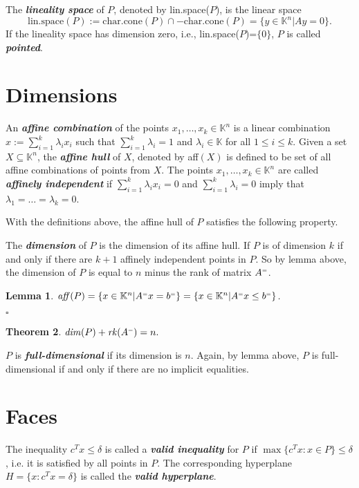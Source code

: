 \documentclass{article}
\newcounter{lecnum}
\newcommand{\teq}{^{\mbox{\tiny $=$}}}
\newtheorem{theorem}{Theorem}[lecnum]
\newtheorem{lemma}[theorem]{Lemma}
\newenvironment{proof}{{\it Proof.}}{ \hfill $\square$}
\def\K{{\mathbb K}}
\begin{document}
The \emph{\textbf{lineality space}} of $P$, denoted by lin.space($P$), is the linear space
$$\mbox{lin.space}(P):=\mbox{char.cone}(P)\cap -\mbox{char.cone}(P)=\{y\in\K^n|Ay=0\}.$$
If the lineality space has dimension zero, i.e., lin.space($P$)=$\{0\}$, $P$ is called \emph{\textbf{pointed}}.

\section{Dimensions}
An \emph{\textbf{affine combination}} of the points $x_1,\dots,x_k\in\K^n$ is a linear combination $x:=\sum_{i=1}^{k}\lambda_i x_i$ such that $\sum_{i=1}^{k}\lambda_i=1$ and $\lambda_i\in\K$ for all $1\leq i\leq k$. Given a set $X\subseteq \K^n$, the \emph{\textbf{affine hull}} of $X$, denoted by aff$(X)$ is defined to be set of all affine combinations of points from $X$. The points $x_1,\dots,x_k\in \K^n$ are called \emph{\textbf{affinely independent}} if $\sum_{i=1}^{k}\lambda_i x_i=0$ and $\sum_{i=1}^{k}\lambda_i=0$ imply that $\lambda_1=\dots=\lambda_k=0$.



With the definitions above, the affine hull of $P$ satisfies the following property.

The \emph{\textbf{dimension}} of $P$ is the dimension of its affine hull. If $P$ is of dimension $k$ if and only if there are $k+1$ affinely independent points in $P$. So by lemma above, the dimension of $P$ is equal to $n$ minus the rank of matrix $A\teq$.

\begin{lemma}
$\mbox{\emph{aff}}(P)=\{x\in\K^n|A\teq x=b\teq \}=\{x\in\K^n|A\teq x\leq b\teq \}$.
\end{lemma}
\begin{proof}
\end{proof}


\begin{theorem}
$\mbox{\emph{dim}}(P)+\mbox{\emph{rk}}(A\teq)=n.$
\end{theorem}
$P$ is \emph{\textbf{full-dimensional}} if its dimension is $n$. Again, by lemma above, $P$ is full-dimensional if and only if there are no implicit equalities.


\section{Faces}

The inequality $c^T x\leqslant \delta$ is called a \emph{\textbf{valid inequality}} for $P$ if $\max\{c^T x: x\in P\}\leqslant \delta$,  i.e. it is satisfied by all points in $P$.  The corresponding hyperplane $H=\{x:c^T x=\delta\}$ is called the \emph{\textbf{valid hyperplane}}.
\end{document}
